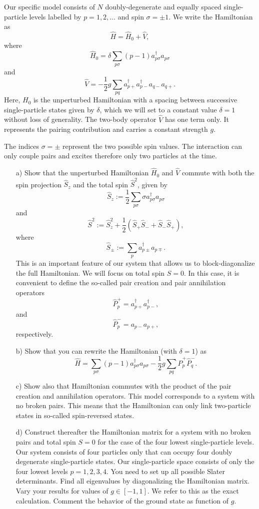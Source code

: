 \begin{prob}
  Our specific model consists of $N$ doubly-degenerate and equally
  spaced single-particle levels labelled by $p=1,2,\dots$ and spin
  $\sigma=\pm 1$.  
  We write the Hamiltonian as
  \[ \hat{H} = \hat{H}_0 + \hat{V} , \]
  where
  \[
  \hat{H}_0=\delta\sum_{p\sigma}(p-1)a_{p\sigma}^{\dagger}a_{p\sigma}
  \]
  and
  \[
  \hat{V}=-\frac{1}{2}g\sum_{pq}a^{\dagger}_{p+}
  a^{\dagger}_{p-}a_{q-}a_{q+}.
  \]
  Here, $H_0$ is the unperturbed Hamiltonian with a spacing between
  successive single-particle states given by $\delta$, which we will set
  to a constant value $\delta=1$ without loss of generality. The two-body
  operator $\hat{V}$ has one term only. It represents the pairing
  contribution and carries a constant strength $g$.

  The indices $\sigma=\pm$ represent the two possible spin values. The
  interaction can only couple pairs and excites therefore only two
  particles at the time.


  \begin{enumerate}
  \item[a)] Show that the unperturbed Hamiltonian $\hat{H}_0$ and
    $\hat{V}$ commute with both the spin projection $\hat{S}_z$ and
    the total spin $\hat{S}^2$, given by
  \[
    \hat{S}_z := \frac{1}{2}\sum_{p\sigma} \sigma
    a^{\dagger}_{p\sigma}a_{p\sigma}
  \]
  and
  \[
    \hat{S}^2 := \hat{S}_z^2 + \frac{1}{2}(\hat{S}_+\hat{S}_- +
    \hat{S}_-\hat{S}_+),
  \]
  where
  \[
    \hat{S}_\pm := \sum_{p} a^{\dagger}_{p\pm} a_{p\mp}.
  \]
  This is an important feature of our system that allows us to
  block-diagonalize the full Hamiltonian. We will focus on total spin
  $S=0$.  In this case, it is convenient to define the so-called pair
  creation and pair annihilation operators
  \[
  \hat{P}^{+}_p = a^{\dagger}_{p+}a^{\dagger}_{p-},
  \]
  and
  \[
  \hat{P}^{-}_p = a_{p-}a_{p+},
  \]
  respectively.
  \item[b)] Show that you can rewrite the Hamiltonian (with $\delta=1$)
    as
  \[
  \hat{H}=\sum_{p\sigma}(p-1)a_{p\sigma}^{\dagger}a_{p\sigma}
  -\frac{1}{2}g\sum_{pq}\hat{P}^{+}_p\hat{P}^{-}_q.
  \]
  \item[c)] Show also that Hamiltonian commutes with the product of
    the pair creation and annihilation operators.  This model
    corresponds to a system with no broken pairs. This means that the
    Hamiltonian can only link two-particle states in so-called
    spin-reversed states.

  \item[d)] Construct thereafter the Hamiltonian matrix for a system
    with no broken pairs and total spin $S=0$ for the case of the four
    lowest single-particle levels. Our system consists of four particles
    only that can occupy four doubly degenerate single-particle states.  
Our single-particle space consists of only the four lowest
    levels $p=1,2,3,4$.  You need to set up all possible Slater
    determinants.  Find all eigenvalues by diagonalizing the
    Hamiltonian matrix.  Vary your results for values of $g\in
    [-1,1]$.  We refer to this as the exact calculation. Comment the
    behavior of the ground state as function of $g$.
  \end{enumerate}
  \end{prob}
